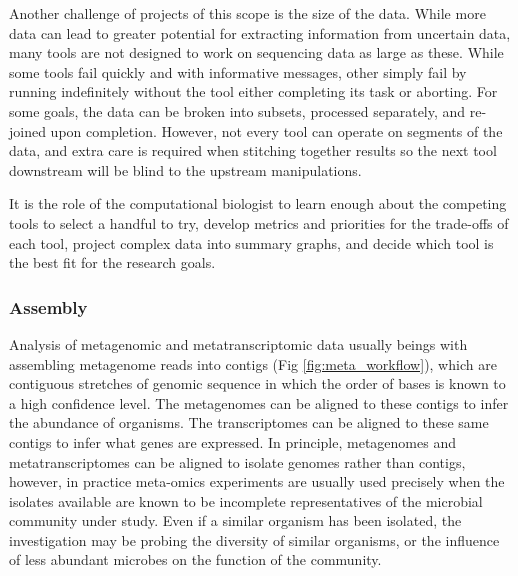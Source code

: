 Another challenge of projects of this scope is the size of the data.
While more data can lead to greater potential for extracting information from uncertain data, many tools are not designed to work on sequencing data as large as these.
While some tools fail quickly and with informative messages, other simply fail by running indefinitely without the tool either completing its task or aborting.
For some goals, the data can be broken into subsets, processed separately, and re-joined upon completion.
However, not every tool can operate on segments of the data, and extra care is required when stitching together results so the next tool downstream will be blind to the upstream manipulations.


It is the role of the computational biologist to learn enough about the competing tools to select a handful to try, develop metrics and priorities for the trade-offs of each tool, project complex data into summary graphs, and decide which tool is the best fit for the research goals.

\subsubsection{Assembly}
Analysis of metagenomic and metatranscriptomic data usually beings with assembling metagenome reads into contigs (Fig \ref{fig:meta_workflow}), which are contiguous stretches of genomic sequence in which the order of bases is known to a high confidence level. %
The metagenomes can be aligned to these contigs to infer the abundance of organisms.
The transcriptomes can be aligned to these same contigs to infer what genes are expressed.
In principle, metagenomes and metatranscriptomes can be aligned to isolate genomes rather than contigs, however, in practice meta-omics experiments are usually used precisely when the isolates available are known to be incomplete representatives of the microbial community under study.
Even if a similar organism has been isolated, the investigation may be probing the diversity of similar organisms, or the influence of less abundant microbes on the function of the community.

